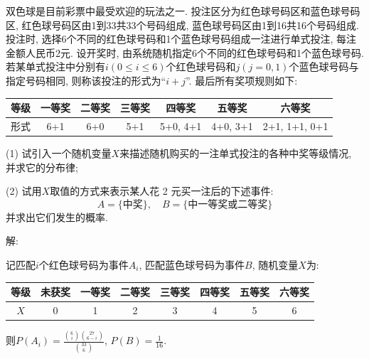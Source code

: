 \documentclass[standard]{ExBook}
\begin{document}
\begin{qitems}
    \begin{bbox}
    \begin{shaded}
        \qitem
双色球是目前彩票中最受欢迎的玩法之一. 投注区分为红色球号码区和蓝色球号码区, 红色球号码区由1到33共33个号码组成, 蓝色球号码区由1到16共16个号码组成.投注时, 选择6个不同的红色球号码和1个蓝色球号码组成一注进行单式投注, 每注金额人民币2元. 设开奖时, 由系统随机指定6个不同的红色球号码和1个蓝色球号码. 若某单式投注中分别有\( i (0 \le i \le 6) \)个红色球号码和\( j (j = 0, 1) \)个蓝色球号码与指定号码相同, 则称该投注的形式为``\( i+j \)''. 最后所有奖项规则如下:
\begin{center}
\setlength{\tabcolsep}{14pt}
\begin{tabular}{c|c|c|c|c|c|c}
\hline
等级 & 一等奖 & 二等奖 & 三等奖 & 四等奖 & 五等奖 & 六等奖 \\
\hline
形式 & 6+1 & 6+0 & 5+1 & 5+0, 4+1 & 4+0, 3+1 & 2+1, 1+1, 0+1 \\
\hline
\end{tabular}
\end{center}
(1) 试引入一个随机变量\( X \)来描述随机购买的一注单式投注的各种中奖等级情况, 并求它的分布律;

(2) 试用\( X \)取值的方式来表示某人花 2 元买一注后的下述事件:
\[
A = \{\text{中奖}\}, \quad B = \{\text{中一等奖或二等奖}\}
\]
并求出它们发生的概率.
    \end{shaded}
    \end{bbox}

\vspace{-5em}

    \begin{bbox}
解: 

记匹配$i$个红色球号码为事件$A_{i}$, 匹配蓝色球号码为事件$B$, 随机变量$X$为:
\begin{center}
\setlength{\tabcolsep}{13pt}
\begin{tabular}{c|c|c|c|c|c|c|c}
\hline
等级 & 未获奖 & 一等奖 & 二等奖 & 三等奖 & 四等奖 & 五等奖 & 六等奖 \\
\hline
$X$ & 0 & 1 & 2 & 3 & 4 & 5 & 6 \\
\hline
\end{tabular}
\end{center}
则$P(A_{i})=\displaystyle\frac{\binom{6}{i}\binom{27}{6-i}}{\binom{33}{6}}$, $P(B)=\displaystyle\frac{1}{16}$.


\end{bbox}
\end{qitems}
\end{document}
